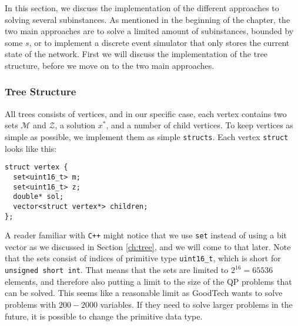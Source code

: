 In this section, we discuss the implementation of the different approaches to
solving several subinstances.
As mentioned in the beginning of the chapter, the two
main approaches are to solve a limited amount of subinstances, bounded
by some $s$, or to implement a discrete event simulator that only stores
the current state of the network. First we will discuss the implementation
of the tree structure, before we move on to the two main approaches.

\subsubsection{Tree Structure}
All trees consists of vertices, and in our specific case, each vertex contains
two sets $\mathcal{M}$ and $\mathcal{Z}$, a solution $x^*$, and a number of
child vertices. To keep vertices as simple as possible, we implement them as
simple \texttt{structs}. Each vertex \texttt{struct} looks like
this:
\begin{verbatim}
struct vertex {
  set<uint16_t> m;
  set<uint16_t> z;
  double* sol;
  vector<struct vertex*> children;
};
\end{verbatim}
A reader familiar with \texttt{C++} might notice that we use
\texttt{set} instead of using a bit vector as we discussed
in Section \ref{ch:tree}, and we will come to that later. Note that
the sets consist of indices of primitive type \texttt{uint16\_t}, which is
short for \texttt{unsigned short int}. That means that the sets are limited to
$2^{16} = 65536$ elements, and therefore also putting a limit to the size
of the QP problems that can be solved. This seems like a reasonable limit
as GoodTech wants to solve problems with $200 - 2000$ variables.
If they need to solve larger problems in the future, it is possible to change
the primitive data type.

